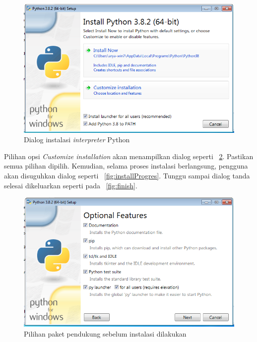 \begin{figure}[h!]
   \begin{center}
     \includegraphics[scale=.5]{pics/installPython1.png}
     \caption{Dialog instalasi \textit{interpreter} Python}
     \label{fig:install1}
   \end{center}
 \end{figure} 

Pilihan opsi \textit{Customize installation} akan menampilkan dialog seperti \figurename~\ref{fig:feature}. Pastikan semua pilihan dipilih. Kemudian, selama proses instalasi berlangsung, pengguna akan disuguhkan dialog seperti \figurename~\ref{fig:installProgres}. Tunggu sampai dialog tanda selesai dikeluarkan seperti pada \figurename~\ref{fig:finish}.

\begin{figure}[h!]
  \begin{center}
    \includegraphics[scale=.5]{pics/featureInstall.png}
    \caption{Pilihan paket pendukung sebelum instalasi dilakukan}
    \label{fig:feature}
  \end{center}
\end{figure}

